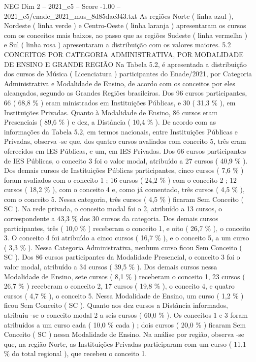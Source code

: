 \begin{textsample}{NEG Dim 2 – 2021\_c5 – Score -1.00 – 2021\_c5/enade\_2021\_mus\_8d85dac343.txt}
As regiões Norte ( linha azul ), Nordeste ( linha verde ) e Centro-Oeste ( linha laranja ) apresentaram os cursos com os conceitos mais baixos, ao passo que as regiões Sudeste ( linha vermelha ) e Sul ( linha rosa ) apresentaram a distribuição com os valores maiores. 5.2 CONCEITOS POR CATEGORIA ADMINISTRATIVA, POR MODALIDADE DE ENSINO E GRANDE REGIÃO Na Tabela 5.2, é apresentada a distribuição dos cursos de Música ( Licenciatura ) participantes do Enade/2021, por Categoria Administrativa e Modalidade de Ensino, de acordo com os conceitos por eles alcançados, segundo as Grandes Regiões brasileiras.
Dos 96 cursos participantes, 66 ( 68,8 \% ) eram ministrados em Instituições Públicas, e 30 ( 31,3 \% ), em Instituições Privadas.
Quanto à Modalidade de Ensino, 86 cursos eram Presenciais ( 89,6 \% ) e dez, a Distância ( 10,4 \% ).
De acordo com as informações da Tabela 5.2, em termos nacionais, entre Instituições Públicas e Privadas, observa -se que, dos quatro cursos avaliados com conceito 5, três eram oferecidos em IES Públicas, e um, em IES Privadas.
Dos 66 cursos participantes de IES Públicas, o conceito 3 foi o valor modal, atribuído a 27 cursos ( 40,9 \% ).
Dos demais cursos de Instituições Públicas participantes, cinco cursos ( 7,6 \% ) foram avaliados com o conceito 1 ; 16 cursos ( 24,2 \% ) com o conceito 2 ; 12 cursos ( 18,2 \% ), com o conceito 4 e, como já comentado, três cursos ( 4,5 \% ), com o conceito 5.
Nessa categoria, três cursos ( 4,5 \% ) ficaram Sem Conceito ( SC ).
Na rede privada, o conceito modal foi o 2, atribuído a 13 cursos, o correspondente a 43,3 \% dos 30 cursos da categoria.
Dos demais cursos participantes, três ( 10,0 \% ) receberam o conceito 1, e oito ( 26,7 \% ), o conceito 3.
O conceito 4 foi atribuído a cinco cursos ( 16,7 \% ), e o conceito 5, a um curso ( 3,3 \% ).
Nessa Categoria Administrativa, nenhum curso ficou Sem Conceito ( SC ).
Dos 86 cursos participantes da Modalidade Presencial, o conceito 3 foi o valor modal, atribuído a 34 cursos ( 39,5 \% ).
Dos demais cursos nessa Modalidade de Ensino, sete cursos ( 8,1 \% ) receberam o conceito 1, 23 cursos ( 26,7 \% ) receberam o conceito 2, 17 cursos ( 19,8 \% ), o conceito 4, e quatro cursos ( 4,7 \% ), o conceito 5.
Nessa Modalidade de Ensino, um curso ( 1,2 \% ) ficou Sem Conceito ( SC ).
Quanto aos dez cursos a Distância informados, atribuiu -se o conceito modal 2 a seis cursos ( 60,0 \% ).
Os conceitos 1 e 3 foram atribuídos a um curso cada ( 10,0 \% cada ) ; dois cursos ( 20,0 \% ) ficaram Sem Conceito ( SC ) nessa Modalidade de Ensino.
Na análise por região, observa -se que, na região Norte, as Instituições Privadas participaram com um curso ( 11,1 \% do total regional ), que recebeu o conceito 1.

\end{textsample}
